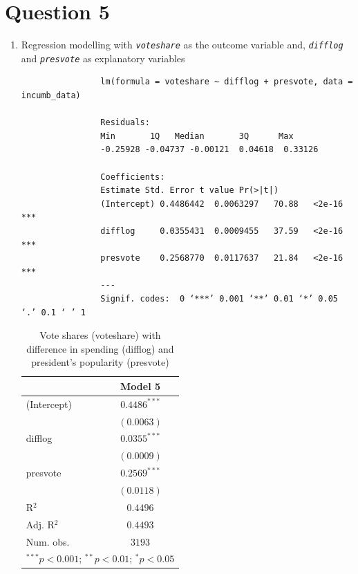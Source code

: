 \documentclass[12pt,letterpaper]{article}
\begin{document}
	\section*{Question 5}
	\begin{enumerate}
		\item Regression modelling with \textit{\texttt{voteshare}} as the outcome variable and, \textit{\texttt{difflog}} and \textit{\texttt{presvote}} as explanatory variables
			
			\begin{verbatim}
				lm(formula = voteshare ~ difflog + presvote, data = incumb_data)
				
				Residuals:
				Min       1Q   Median       3Q      Max 
				-0.25928 -0.04737 -0.00121  0.04618  0.33126 
				
				Coefficients:
				Estimate Std. Error t value Pr(>|t|)    
				(Intercept) 0.4486442  0.0063297   70.88   <2e-16 ***
				difflog     0.0355431  0.0009455   37.59   <2e-16 ***
				presvote    0.2568770  0.0117637   21.84   <2e-16 ***
				---
				Signif. codes:  0 ‘***’ 0.001 ‘**’ 0.01 ‘*’ 0.05 ‘.’ 0.1 ‘ ’ 1
			\end{verbatim}
			\begin{table}[H]
				\begin{center}
					\begin{tabular}{l c}
						\hline
						& Model 5 \\
						\hline
						(Intercept) & $0.4486^{***}$ \\
						& $(0.0063)$     \\
						difflog     & $0.0355^{***}$ \\
						& $(0.0009)$     \\
						presvote    & $0.2569^{***}$ \\
						& $(0.0118)$     \\
						\hline
						R$^2$       & $0.4496$       \\
						Adj. R$^2$  & $0.4493$       \\
						Num. obs.   & $3193$         \\
						\hline
						\multicolumn{2}{l}{\scriptsize{$^{***}p<0.001$; $^{**}p<0.01$; $^{*}p<0.05$}}
					\end{tabular}
					\caption{Vote shares (voteshare) with difference in spending (difflog) and president's popularity (presvote)}
					\label{table:coefficients}
				\end{center}
			\end{table}
		

\end{enumerate}
\end{document}

